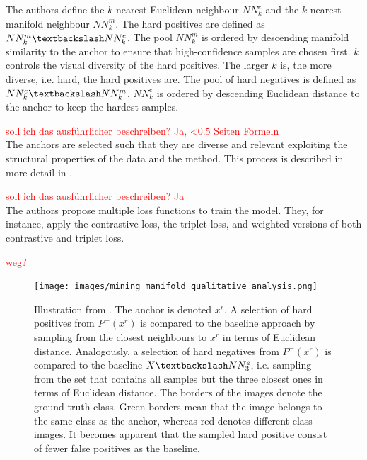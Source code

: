 The authors define the $k$ nearest Euclidean neighbour $NN^e_k$ and 
the $k$ nearest manifold neighbour $NN^m_k$.
The hard positives are defined as $NN^m_k \textbackslash NN^e_k$. 
The pool $NN^m_k$ is ordered by descending manifold similarity to the anchor
to ensure that high-confidence samples are chosen first.
$k$ controls the visual diversity of the hard positives.
The larger $k$ is, the more diverse, i.e. hard, the hard positives are. 
The pool of hard negatives is defined as $NN^e_k \textbackslash NN^m_k$.
$NN^e_k$ is ordered by descending Euclidean distance to the anchor to keep the hardest samples.

\textcolor{red}{soll ich das ausführlicher beschreiben? Ja, <0.5 Seiten Formeln\\}
The anchors are selected such that they are diverse and relevant 
exploiting the structural properties of the data and the method.
This process is described in more detail in \citet{mining_manifolds_2018}.

\textcolor{red}{soll ich das ausführlicher beschreiben? Ja\\}
The authors propose multiple loss functions to train the model.
They, for instance, apply the contrastive loss, the triplet loss, 
and weighted versions of both contrastive and triplet loss.

\textcolor{red}{weg?\\}

\begin{figure}[h] %
    \centering
    \texttt{[image: images/mining\_manifold\_qualitative\_analysis.png]}
    \caption{Illustration from \citet{mining_manifolds_2018}.
    The anchor is denoted $x^r$.
    A selection of hard positives from $P^+(x^r)$ is compared to the 
    baseline approach by sampling from the closest neighbours to $x^r$ in 
    terms of Euclidean distance.
    Analogously, a selection of hard negatives from $P^-(x^r)$ 
    is compared to the baseline $X \textbackslash NN^e_3$, 
    i.e. sampling from the set that contains all samples but the three closest ones in 
    terms of Euclidean distance.
    The borders of the images denote the ground-truth class.
    Green borders mean that the image belongs to the same class as the anchor,
    whereas red denotes different class images.
    It becomes apparent that the sampled hard positive consist of fewer false positives 
    as the baseline.
    }
    \label{fig:manifold_mining_qualitative_analysis}
\end{figure}


